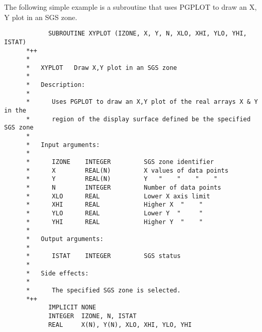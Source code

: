 The following simple example is a subroutine that uses PGPLOT to draw an X, Y
plot in an SGS zone.
\begin{small}
\begin{verbatim}
            SUBROUTINE XYPLOT (IZONE, X, Y, N, XLO, XHI, YLO, YHI, ISTAT)    
      *++                                                                    
      *                                                                      
      *   XYPLOT   Draw X,Y plot in an SGS zone                              
      *                                                                      
      *   Description:                                                       
      *                                                                      
      *      Uses PGPLOT to draw an X,Y plot of the real arrays X & Y in the 
      *      region of the display surface defined be the specified SGS zone 
      *                                                                      
      *   Input arguments:                                                   
      *                                                                      
      *      IZONE    INTEGER         SGS zone identifier                    
      *      X        REAL(N)         X values of data points                
      *      Y        REAL(N)         Y   "    "    "    "                   
      *      N        INTEGER         Number of data points                  
      *      XLO      REAL            Lower X axis limit                     
      *      XHI      REAL            Higher X  "    "                       
      *      YLO      REAL            Lower Y  "     "                       
      *      YHI      REAL            Higher Y  "    "                       
      *                                                                      
      *   Output arguments:                                                  
      *                                                                      
      *      ISTAT    INTEGER         SGS status                             
      *                                                                      
      *   Side effects:                                                      
      *                                                                      
      *      The specified SGS zone is selected.                             
      *++                                                                    
            IMPLICIT NONE                                                    
            INTEGER  IZONE, N, ISTAT                                         
            REAL     X(N), Y(N), XLO, XHI, YLO, YHI                          
                                                                             

\end{verbatim}
\end{small}
